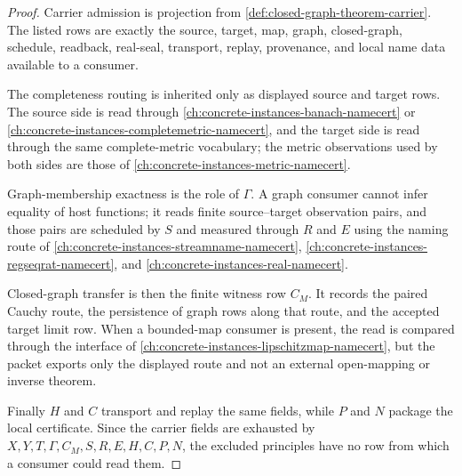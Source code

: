 \begin{proof}
Carrier admission is projection from \autoref{def:closed-graph-theorem-carrier}. The listed rows are exactly the source, target, map, graph, closed-graph, schedule, readback, real-seal, transport, replay, provenance, and local name data available to a consumer.

The completeness routing is inherited only as displayed source and target rows. The source side is read through \autoref{ch:concrete-instances-banach-namecert} or \autoref{ch:concrete-instances-completemetric-namecert}, and the target side is read through the same complete-metric vocabulary; the metric observations used by both sides are those of \autoref{ch:concrete-instances-metric-namecert}.

Graph-membership exactness is the role of $\Gamma$. A graph consumer cannot infer equality of host functions; it reads finite source--target observation pairs, and those pairs are scheduled by $S$ and measured through $R$ and $E$ using the naming route of \autoref{ch:concrete-instances-streamname-namecert}, \autoref{ch:concrete-instances-regseqrat-namecert}, and \autoref{ch:concrete-instances-real-namecert}.

Closed-graph transfer is then the finite witness row $C_M$. It records the paired Cauchy route, the persistence of graph rows along that route, and the accepted target limit row. When a bounded-map consumer is present, the read is compared through the interface of \autoref{ch:concrete-instances-lipschitzmap-namecert}, but the packet exports only the displayed route and not an external open-mapping or inverse theorem.

Finally $H$ and $C$ transport and replay the same fields, while $P$ and $N$ package the local certificate. Since the carrier fields are exhausted by $X,Y,T,\Gamma,C_M,S,R,E,H,C,P,N$, the excluded principles have no row from which a consumer could read them.
\end{proof}

